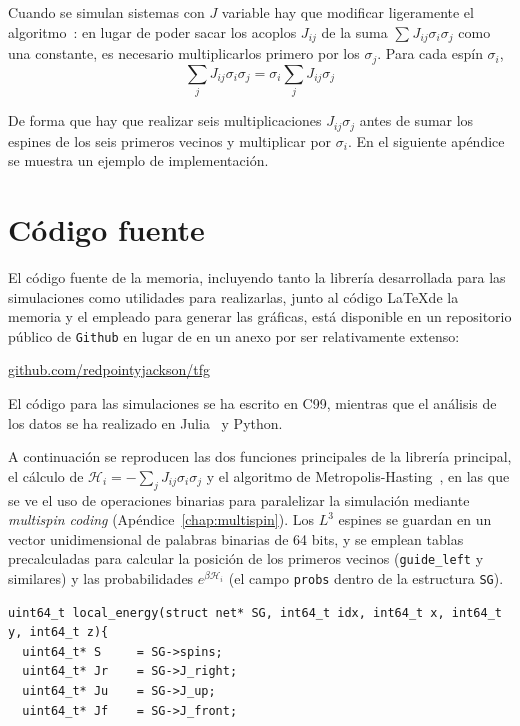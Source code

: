 \documentclass[11pt]{report}
\newcommand{\Ham}{\mathscr{H}}
\begin{document}
\begin{appendices}
Cuando se simulan sistemas con $J$ variable hay que modificar
ligeramente el algoritmo~\cite{multispincoding}: en lugar de poder
sacar los acoplos $J_{ij}$ de la suma $\sum_{} J_{ij}σ_iσ_j$ como una
constante, es necesario multiplicarlos primero por los $σ_j$. Para
cada espín $σ_i$,
\begin{equation}
  \sum_{j} J_{ij} σ_i σ_j = σ_i \sum_{j} J_{ij} σ_j
\end{equation}

De forma que hay que realizar seis multiplicaciones $J_{ij}σ_j$ antes
de sumar los espines de los seis primeros vecinos y multiplicar por
$σ_i$. En el siguiente apéndice se muestra un ejemplo de implementación.

\chapter{Código fuente}
El código fuente de la memoria, incluyendo tanto la librería
desarrollada para las simulaciones como utilidades para realizarlas,
junto al código \LaTeX de la memoria y el empleado para generar las
gráficas, está disponible en un repositorio público de \texttt{Github}
en lugar de en un anexo por ser relativamente extenso:
\begin{flushright}
  \url{github.com/redpointyjackson/tfg}
\end{flushright}

El código para las simulaciones se ha escrito en C99, mientras que el
análisis de los datos se ha realizado en Julia~\cite{julialang} y Python.

A continuación se reproducen las dos funciones principales de la
librería principal, el cálculo de $\Ham_i = -\sum_{j} J_{ij} σ_i σ_j$
y el algoritmo de Metropolis-Hasting~\cite{metropolis}, en las que se
ve el uso de operaciones binarias para paralelizar la simulación
mediante \textit{multispin coding} (Apéndice~\ref{chap:multispin}).
Los $L^3$ espines se guardan en un vector unidimensional de palabras
binarias de 64 bits, y se emplean tablas precalculadas para calcular
la posición de los primeros vecinos (\texttt{guide\_left} y similares)
y las probabilidades $e^{β \Ham_i}$ (el campo \texttt{probs} dentro de
la estructura \texttt{SG}).

\vspace{1cm}

\begin{verbatim}
uint64_t local_energy(struct net* SG, int64_t idx, int64_t x, int64_t y, int64_t z){
  uint64_t* S     = SG->spins;
  uint64_t* Jr    = SG->J_right;
  uint64_t* Ju    = SG->J_up;
  uint64_t* Jf    = SG->J_front;


\end{verbatim}
\end{appendices}
\end{document}
